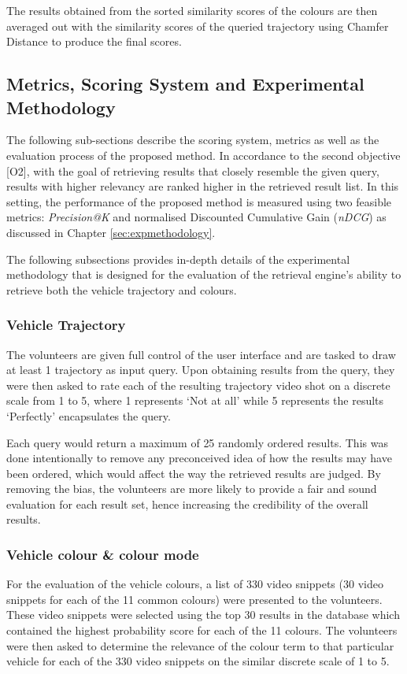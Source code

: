 The results obtained from the sorted similarity scores of the colours are then averaged out with the similarity scores of the queried trajectory using Chamfer Distance to produce the final scores.

\subsection{Metrics, Scoring System and Experimental Methodology}
\label{sec:retrieval-metrics}
The following sub-sections describe the scoring system, metrics as well as the evaluation process of the proposed method. 
In accordance to the second objective [O2], with the goal of retrieving results that closely resemble the given query, results with higher relevancy are ranked higher in the retrieved result list. In this setting, the performance of the proposed method is measured using two feasible metrics: \textit{Precision@K} and normalised Discounted Cumulative Gain (\textit{nDCG}) as discussed in Chapter \ref{sec:expmethodology}.

The following subsections provides in-depth details of the experimental methodology that is designed for the evaluation of the retrieval engine's ability to retrieve both the vehicle trajectory and colours.

\vspace{1em}
\subsubsection{Vehicle Trajectory}
The volunteers are given full control of the user interface and are tasked to draw at least 1 trajectory as input query. Upon obtaining results from the query, they were then asked to rate each of the resulting trajectory video shot on a discrete scale from 1 to 5, where 1 represents `Not at all' while 5 represents the results `Perfectly' encapsulates the query.

Each query would return a maximum of 25 randomly ordered results. This was done intentionally to remove any preconceived idea of how the results may have been ordered, which would affect the way the retrieved results are judged. By removing the bias, the volunteers are more likely to provide a fair and sound evaluation for each result set, hence increasing the credibility of the overall results.

\vspace{1em}
\subsubsection{Vehicle colour \& colour mode}
\label{subsec:vehColor}
For the evaluation of the vehicle colours, a list of 330 video snippets (30 video snippets for each of the 11 common colours) were presented to the volunteers. These video snippets were selected using the top 30 results in the database which contained the highest probability score for each of the 11
colours. The volunteers were then asked to determine the relevance of the colour term to that particular vehicle for each of the 330 video snippets on the similar discrete scale of 1 to 5.

